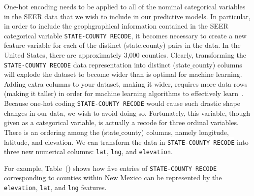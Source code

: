 \documentclass[10pt,letterpaper]{article}
\newcommand{\codewhite}[1]{\colorbox{white}{\texttt{#1}}}
\begin{document}
One-hot encoding needs to be applied to all of the nominal categorical variables in the SEER data that we wish to include in our predictive models.
In particular, in order to include the geophgraphical information contained in the SEER categorical variable \codewhite{STATE-COUNTY RECODE}, it becomes necessary to create a new feature variable for each of the distinct (state,county) pairs in the data. In the United States, there are approximately 3,000 counties. Clearly, transforming the \codewhite{STATE-COUNTY RECODE} data representation into distinct (state$\_$county) columns will explode the dataset to become wider than is optimal for machine learning. Adding extra columns to your dataset, making it wider, requires more data rows (making it taller) in order for machine learning algorithms to effectively learn~\cite{bowles}. Because one-hot coding \codewhite{STATE-COUNTY RECODE} would cause such drastic shape changes in our data, we wish to avoid doing so. Fortunately, this variable, though given as a categorical variable, is actually a recode for three ordinal variables. There is an ordering among the (state$\_$county) columns, namely longitude, latitude, and elevation. We can transform the data in \codewhite{STATE-COUNTY RECODE} into three new numerical columns: \codewhite{lat}, \codewhite{lng}, and \codewhite{elevation}.

For example, Table~() shows how five entries of \codewhite{STATE-COUNTY RECODE} corresponding to counties within New Mexico can be represented by the 
\codewhite{elevation}, \codewhite{lat}, and \codewhite{lng} features.

\end{document}
